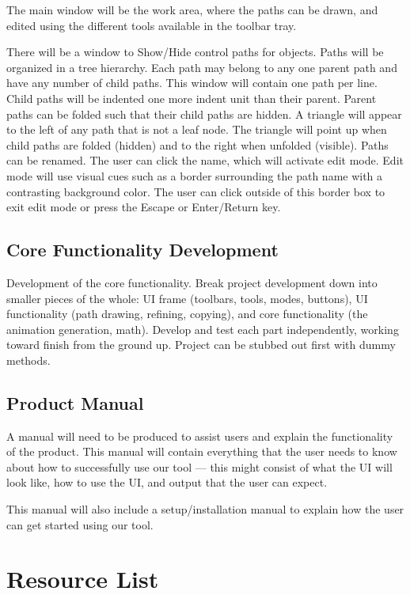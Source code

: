 \documentclass[12pt]{article}
\begin{document}
The main window will be the work area, where the paths can be drawn, and edited using the different tools available in the toolbar tray.

There will be a window to Show/Hide control paths for objects. Paths will be organized in a tree hierarchy. Each path may belong to any one parent path and have any number of child paths. This window will contain one path per line. Child paths will be indented one more indent unit than their parent. Parent paths can be folded such that their child paths are hidden. A triangle will appear to the left of any path that is not a leaf node. The triangle will point up when child paths are folded (hidden) and to the right when unfolded (visible). Paths can be renamed. The user can click the name, which will activate edit mode. Edit mode will use visual cues such as a border surrounding the path name with a contrasting background color. The user can click outside of this border box to exit edit mode or press the Escape or Enter/Return key.

\subsection{Core Functionality Development}
Development of the core functionality. Break project development down into smaller pieces of the whole: UI frame (toolbars, tools, modes, buttons), UI functionality (path drawing, refining, copying), and core functionality (the animation generation, math). Develop and test each part independently, working toward finish from the ground up. Project can be stubbed out first with dummy methods.

\subsection{Product Manual}
A manual will need to be produced to assist users and explain the functionality of the product. This manual will contain everything that the user needs to know about how to successfully use our tool --- this might consist of what the UI will look like, how to use the UI, and output that the user can expect. 

This manual will also include a setup/installation manual to explain how the user can get started using our tool.

\section{Resource List}
\label{sec:resource}
\end{document}
